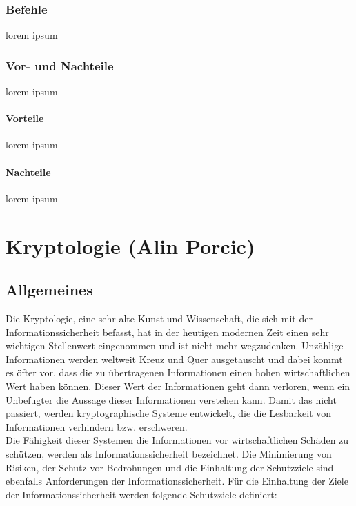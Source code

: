 \documentclass[12pt,a4paper]{report}
\begin{document}
\subsection{Befehle}
lorem ipsum
\subsection{Vor- und Nachteile}
lorem ipsum
\subsubsection{Vorteile}
lorem ipsum
\subsubsection{Nachteile}
lorem ipsum

\chapter{Kryptologie (Alin Porcic)}\label{chap:krypto}
\section{Allgemeines}

Die Kryptologie, eine sehr alte Kunst und Wissenschaft, die sich mit der Informationssicherheit befasst, hat in der heutigen modernen Zeit einen sehr wichtigen Stellenwert eingenommen und ist nicht mehr wegzudenken. Unzählige Informationen werden weltweit Kreuz und Quer ausgetauscht und dabei kommt es öfter vor, dass die zu übertragenen Informationen einen hohen wirtschaftlichen Wert haben können. Dieser Wert der Informationen geht dann verloren, wenn ein Unbefugter die Aussage dieser Informationen verstehen kann. Damit das nicht passiert, werden kryptographische Systeme entwickelt, die die Lesbarkeit von Informationen verhindern bzw. erschweren.\\

Die Fähigkeit dieser Systemen die Informationen vor wirtschaftlichen Schäden zu schützen, werden als Informationssicherheit bezeichnet. Die Minimierung von Risiken, der Schutz vor Bedrohungen und die Einhaltung der Schutzziele sind ebenfalls Anforderungen der Informationssicherheit. Für die Einhaltung der Ziele der Informationssicherheit werden folgende Schutzziele definiert:
\end{document}
